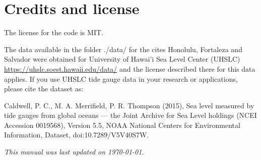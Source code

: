 \documentclass[11pt,a4paper]{article}
\begin{document}
\section*{Credits and license}
The license for the code is MIT. 

The data available in the folder ./data/ for the cites   Honolulu, Fortaleza and Salvador were obtained  for University of Hawai'i Sea Level Center (UHSLC) \url{https://uhslc.soest.hawaii.edu/data/} and the license described there for this data applies. If  you use UHSLC tide gauge data in your research or applications, please cite the dataset as:

Caldwell, P. C., M. A. Merrifield, P. R. Thompson (2015), Sea level measured by tide gauges from global oceans — the Joint Archive for Sea Level holdings (NCEI Accession 0019568), Version 5.5, NOAA National Centers for Environmental Information, Dataset, doi:10.7289/V5V40S7W.

\vfill
\begin{center}
\small \textit{This manual was last updated on \today.}
\end{center}
\end{document}
